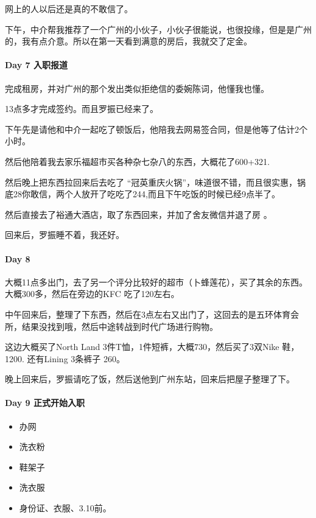\documentclass[UTF8,a4paper,8pt]{ctexart}
\begin{document}
		 	 网上的人以后还是真的不敢信了。
		 	 
		 	 下午，中介帮我推荐了一个广州的小伙子，小伙子很能说，也很投缘，但是是广州的，我有点介意。所以在第一天看到满意的房后，我就交了定金。
 
 	 \paragraph{Day 7    入职报道    \quad     }
			 完成租房，并对广州的那个发出类似拒绝信的委婉陈词，他懂我也懂。
			 
			 13点多才完成签约。而且罗振已经来了。
			 
			 下午先是请他和中介一起吃了顿饭后，他陪我去网易签合同，但是他等了估计2个小时。
			 
			 然后他陪着我去家乐福超市买各种杂七杂八的东西，大概花了600+321. 
			 
			 然后晚上把东西拉回来后去吃了 “冠英重庆火锅”，味道很不错，而且很实惠，锅底28你敢信，两个人放开了吃吃了244,而且下午吃饭的时候已经9点半了。
			
			 然后直接去了裕通大酒店，取了东西回来，并加了舍友微信并退了房	 。
			 
			 回来后，罗振睡不着，我还好。
 	 \paragraph{Day 8       \quad     }
		 	 大概11点多出门，去了另一个评分比较好的超市（卜蜂莲花），买了其余的东西。大概300多，然后在旁边的KFC 吃了120左右。
		 	 
		 	 中午回来后，整理了下东西，然后在3点左右又出门了，这回去的是五环体育会所，结果没找到哦，然后中途转战到时代广场进行购物。
		 	 
		 	 这边大概买了North Land 3件T恤，1件短裤，大概730，然后买了3双Nike 鞋，1200. 还有Lining 3条裤子 260。
		 	 
		 	 晚上回来后，罗振请吃了饭，然后送他到广州东站，回来后把屋子整理了下。
 	 \paragraph{Day 9   正式开始入职   \quad     }
		 \begin{itemize}
			 \item 办网
			 \item 洗衣粉
			 \item 鞋架子
			 \item 洗衣服
			 \item 身份证、衣服、3.10前。
		 \end{itemize}
		 
\end{document}
